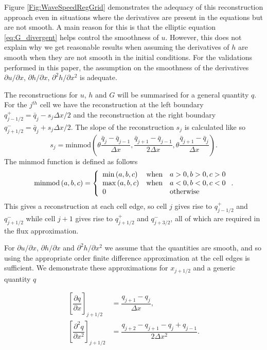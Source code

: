 \documentclass[10pt]{elsarticle}
\begin{document}
Figure \ref{Fig:WaveSpeedRegGrid} demonstrates the adequacy of this reconstruction approach even in situations where the derivatives are present in the equations but are not smooth. A main reason for this is that the elliptic equation \eqref{eq:G_divergent} helps control the smoothness of $u$. However, this does not explain why we get reasonable results when assuming the derivatives of $h$ are smooth when they are not smooth in the initial conditions. For the validations performed in this paper, the assumption on the smoothness of the derivatives $\partial u / \partial x$, $\partial h / \partial x$, $\partial^2 h / \partial x^2$ is adequate.


The reconstructions for $u$, $h$ and $G$ will be summarised for a general quantity $q$. For the $j^{th}$ cell we have the reconstruction at the left boundary $q^+_{j-1/2} = \bar{q}_j -  s_j {\Delta x}/{2} $ and the reconstruction at the right boundary $q^-_{j+1/2} = \bar{q}_j + s_j {\Delta x}/{2}$. The slope of the reconstruction $s_j$ is calculated like so
\begin{equation}
s_j = \text{minmod}\left(\theta \dfrac{\bar{q}_j - \bar{q}_{j-1}}{\Delta x},  \dfrac{\bar{q}_{j+1} - \bar{q}_{j-1}}{2\Delta x},\theta \dfrac{\bar{q}_{j+1} - \bar{q}_{j}}{\Delta x}\right).
\end{equation}
The minmod function is defined as follows
\begin{equation}
\text{minmod}\left(a,b,c\right) = \left\lbrace \begin{array}{l c l}
\min{\left(a,b,c\right)} & \text{when} & a>0, b>0, c>0 \\
\max{\left(a,b,c\right)} & \text{when} & a<0, b<0, c<0 \\
0 & & \text{otherwise}
\end{array} \right. . 
\end{equation}
This gives a reconstruction at each cell edge, so cell $j$ gives rise to $q^+_{j-1/2}$ and $q^-_{j+1/2} $ while cell $j+1$ gives rise to $q^+_{j+1/2}$ and $q^-_{j+3/2}$, all of which are required in the flux approximation.

For $\partial u / \partial x$, $\partial h / \partial x$ and $\partial^2 h / \partial x^2$ we assume that the quantities are smooth, and so using the appropriate order finite difference approximation at the cell edges is sufficient. We demonstrate these approximations for $x_{j+1/2}$ and a generic quantity $q$

\begin{align*}
\left[\dfrac{\partial q}{\partial x} \right]_{j+1/2} &= \dfrac{q_{j+1} - q_j}{\Delta x}, \\
\left[\dfrac{\partial^2 q}{\partial x^2} \right]_{j+1/2} &=  \dfrac{q_{j+2} - q_{j+1} - q_j + q_{j-1}}{2 \Delta x^2} .
\end{align*}
\end{document}
